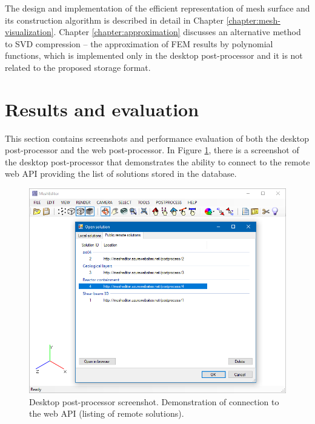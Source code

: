 The design and implementation of the efficient representation of mesh surface and its construction algorithm is described in detail in Chapter \ref{chapter:mesh-visualization}. Chapter \ref{chapter:approximation} discusses an alternative method to SVD compression -- the approximation of FEM results by polynomial functions, which is implemented only in the desktop post-processor and it is not related to the proposed storage format.



\pagebreak

\section{Results and evaluation}

This section contains screenshots and performance evaluation of both the desktop post-processor and the web post-processor. In Figure \ref{fig:desktop-postprocessor-remote-solutions}, there is a screenshot of the desktop post-processor that demonstrates the ability to connect to the remote web API providing the list of solutions stored in the database.

\begin{figure}[H]
    \centering
    \includegraphics[width=\textwidth]{figures/chapter-data-management/desktop-postprocessor-remote-solutions}
    \decoRule
    \caption[Desktop post-processor screenshot. List of remote solutions.]{Desktop post-processor screenshot. Demonstration of connection to the web API (listing of remote solutions).}
    \label{fig:desktop-postprocessor-remote-solutions}
\end{figure}

